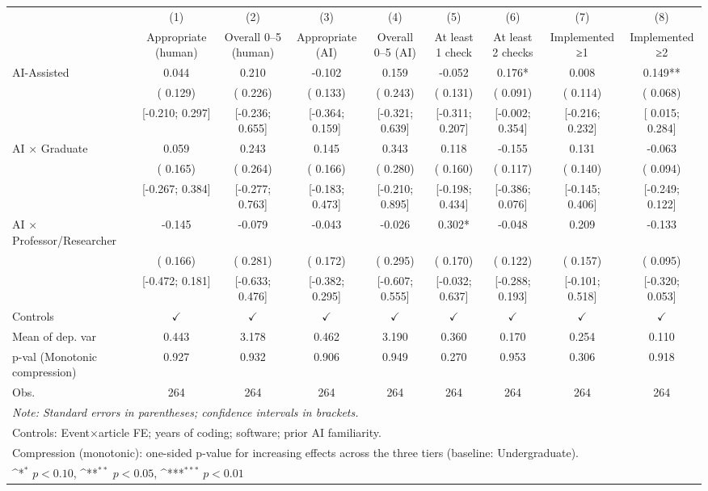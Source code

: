 \def\sym#1{\ifmmode^{#1}\else\(^{#1}\)\fi}
\begin{tabular}{l*{8}{c}}
\hline\hline
 & (1) & (2) & (3) & (4) & (5) & (6) & (7) & (8)
\\
 & Appropriate (human) & Overall 0–5 (human) & Appropriate (AI) & Overall 0–5 (AI) & At least 1 check & At least 2 checks & Implemented ≥1 & Implemented ≥2
 \\
\hline
AI-Assisted &  0.044 &  0.210 & -0.102 &  0.159 & -0.052 &  0.176* &  0.008 &  0.149**
\\
 & ( 0.129) & ( 0.226) & ( 0.133) & ( 0.243) & ( 0.131) & ( 0.091) & ( 0.114) & ( 0.068)
\\
 & [-0.210;  0.297] & [-0.236;  0.655] & [-0.364;  0.159] & [-0.321;  0.639] & [-0.311;  0.207] & [-0.002;  0.354] & [-0.216;  0.232] & [ 0.015;  0.284]
\\
AI × Graduate &  0.059 &  0.243 &  0.145 &  0.343 &  0.118 & -0.155 &  0.131 & -0.063
\\
 & ( 0.165) & ( 0.264) & ( 0.166) & ( 0.280) & ( 0.160) & ( 0.117) & ( 0.140) & ( 0.094)
\\
 & [-0.267;  0.384] & [-0.277;  0.763] & [-0.183;  0.473] & [-0.210;  0.895] & [-0.198;  0.434] & [-0.386;  0.076] & [-0.145;  0.406] & [-0.249;  0.122]
\\
AI × Professor/Researcher & -0.145 & -0.079 & -0.043 & -0.026 &  0.302* & -0.048 &  0.209 & -0.133
\\
 & ( 0.166) & ( 0.281) & ( 0.172) & ( 0.295) & ( 0.170) & ( 0.122) & ( 0.157) & ( 0.095)
\\
 & [-0.472;  0.181] & [-0.633;  0.476] & [-0.382;  0.295] & [-0.607;  0.555] & [-0.032;  0.637] & [-0.288;  0.193] & [-0.101;  0.518] & [-0.320;  0.053]
\\
\hline
Controls & $\checkmark$ & $\checkmark$ & $\checkmark$ & $\checkmark$ & $\checkmark$ & $\checkmark$ & $\checkmark$ & $\checkmark$
\\
Mean of dep. var &  0.443 &  3.178 &  0.462 &  3.190 &  0.360 &  0.170 &  0.254 &  0.110
\\
p-val (Monotonic compression) &  0.927 &  0.932 &  0.906 &  0.949 &  0.270 &  0.953 &  0.306 &  0.918
\\
Obs. & 264 & 264 & 264 & 264 & 264 & 264 & 264 & 264
\\
\hline
\hline\hline
\multicolumn{9}{l}{\it{Note:} Standard errors in parentheses; confidence intervals in brackets.}\\
\multicolumn{9}{l}{Controls: Event×article FE; years of coding; software; prior AI familiarity.}\\
\multicolumn{9}{l}{Compression (monotonic): one-sided p-value for increasing effects across the three tiers (baseline: Undergraduate).}\\
\multicolumn{9}{l}{\sym{*} $p<0.10$, \sym{**} $p<0.05$,  \sym{***} $p<0.01$}\\
\end{tabular}
